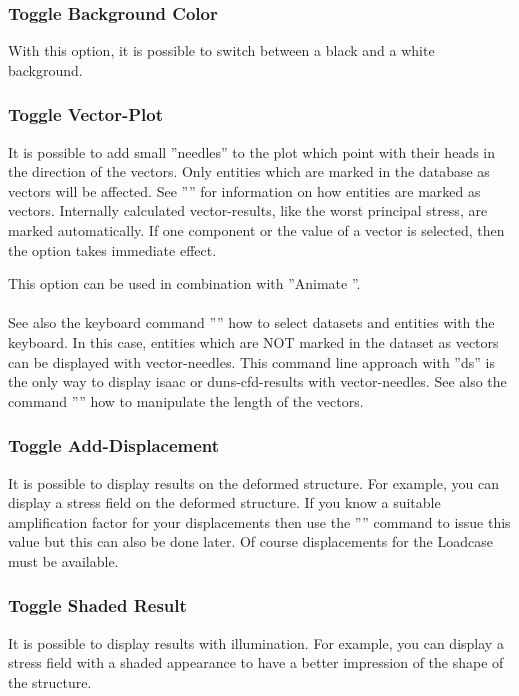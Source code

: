 \documentclass{article}
\begin{document}
\subsubsection{\label{Toggle Background Color}Toggle Background Color}
With this option, it is possible to switch between a black and a white background.

\subsubsection{\label{Toggle Vector-Plot}Toggle Vector-Plot}
It is possible to add small ''needles'' to the plot which point with their heads in the direction of the vectors. Only entities which are marked in the database as vectors will be affected. See '''' for information on how entities are marked as vectors. Internally calculated vector-results, like the worst principal stress, are marked automatically. If one component or the value of a vector is selected, then the option takes immediate effect.

This option can be used in combination with ''Animate ''.\\\\See also the keyboard command '''' how to select datasets and entities with the keyboard. In this case, entities which are NOT marked in the dataset as vectors can be displayed with vector-needles. This command line approach with ''ds'' is the only way to display isaac or duns-cfd-results with vector-needles. See also the command '''' how to manipulate the length of the vectors.  

\subsubsection{\label{Toggle Add-Displacement}Toggle Add-Displacement}
It is possible to display results on the deformed structure. For example, you can display a stress field on the deformed structure. If you know a suitable amplification factor for your displacements then use the '''' command to issue this value but this can also be done later. Of course displacements for the Loadcase must be available.

\subsubsection{\label{Toggle Shaded Result}Toggle Shaded Result}
It is possible to display results with illumination. For example, you can display a stress field with a shaded appearance to have a better impression of the shape of the structure.
\end{document}
